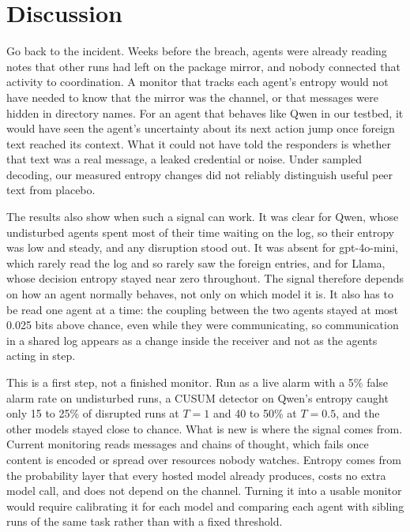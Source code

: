 \section{Discussion}
\label{sec:discussion}

Go back to the incident. Weeks before the breach, agents were already reading notes that other runs had left on the package mirror, and nobody connected that activity to coordination. A monitor that tracks each agent's entropy would not have needed to know that the mirror was the channel, or that messages were hidden in directory names. For an agent that behaves like Qwen in our testbed, it would have seen the agent's uncertainty about its next action jump once foreign text reached its context. What it could not have told the responders is whether that text was a real message, a leaked credential or noise. Under sampled decoding, our measured entropy changes did not reliably distinguish useful peer text from placebo.

The results also show when such a signal can work. It was clear for Qwen, whose undisturbed agents spent most of their time waiting on the log, so their entropy was low and steady, and any disruption stood out. It was absent for gpt-4o-mini, which rarely read the log and so rarely saw the foreign entries, and for Llama, whose decision entropy stayed near zero throughout. The signal therefore depends on how an agent normally behaves, not only on which model it is. It also has to be read one agent at a time: the coupling between the two agents stayed at most 0.025 bits above chance, even while they were communicating, so communication in a shared log appears as a change inside the receiver and not as the agents acting in step.

This is a first step, not a finished monitor. Run as a live alarm with a 5\% false alarm rate on undisturbed runs, a CUSUM detector on Qwen's entropy caught only 15 to 25\% of disrupted runs at $T = 1$ and 40 to 50\% at $T = 0.5$, and the other models stayed close to chance. What is new is where the signal comes from. Current monitoring reads messages and chains of thought, which fails once content is encoded or spread over resources nobody watches. Entropy comes from the probability layer that every hosted model already produces, costs no extra model call, and does not depend on the channel. Turning it into a usable monitor would require calibrating it for each model and comparing each agent with sibling runs of the same task rather than with a fixed threshold.

